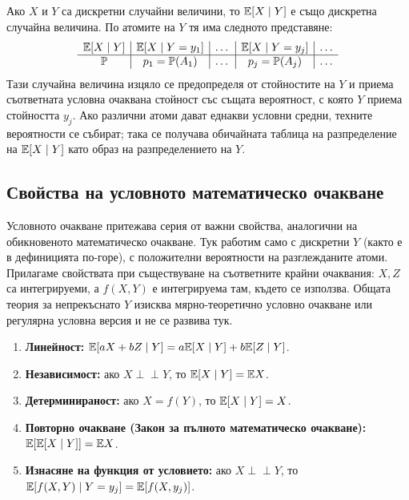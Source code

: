 \begin{prop}
Ако $X$ и $Y$ са дискретни случайни величини, то $\mathbb{E}[X\mid Y]$ е също дискретна случайна величина. По атомите на $Y$ тя има следното представяне:
\[
\begin{array}{c|c|c|c|c}
\mathbb{E}[X \mid Y] & \mathbb{E}[X \mid Y=y_1] & \dots & \mathbb{E}[X \mid Y=y_j] & \dots \\
\hline
\mathbb{P} & p_1 = \mathbb{P}(A_1) & \dots & p_j = \mathbb{P}(A_j) & \dots
\end{array}
\]
Тази случайна величина изцяло се предопределя от стойностите на $Y$ и приема съответната условна очаквана стойност със същата вероятност, с която $Y$ приема стойността $y_j$. Ако различни атоми дават еднакви условни средни, техните вероятности се събират; така се получава обичайната таблица на разпределение на $\mathbb{E}[X\mid Y]$ като образ на разпределението на $Y$.
\end{prop}

\subsection{Свойства на условното математическо очакване}

Условното очакване притежава серия от важни свойства, аналогични на обикновеното математическо очакване. Тук работим само с дискретни $Y$ (както е в дефиницията по-горе), с положителни вероятности на разглежданите атоми. Прилагаме свойствата при съществуване на съответните крайни очаквания: $X,Z$ са интегрируеми, а $f(X,Y)$ е интегрируема там, където се използва. Общата теория за непрекъснато $Y$ изисква мярно-теоретично условно очакване или регулярна условна версия и не се развива тук.

\begin{prop}\label{prop:cond-exp-props}
\begin{enumerate}
    \item[а)] \textbf{Линейност:}
    $\mathbb{E}[aX + bZ \mid Y] = a\mathbb{E}[X \mid Y] + b\mathbb{E}[Z \mid Y]$.
    \item[б)] \textbf{Независимост:} ако $X \perp\!\!\!\perp Y$, то $\mathbb{E}[X \mid Y] = \mathbb{E} X$.
    \item[в)] \textbf{Детерминираност:} ако $X = f(Y)$, то $\mathbb{E}[X \mid Y] = X$.
    \item[г)] \textbf{Повторно очакване (Закон за пълното математическо очакване):}
    $\mathbb{E}[\mathbb{E}[X \mid Y]] = \mathbb{E} X$.
    \item[д)] \textbf{Изнасяне на функция от условието:} ако $X \perp\!\!\!\perp Y$, то
    $\mathbb{E}[f(X,Y) \mid Y=y_j] = \mathbb{E}[f(X, y_j)]$.
\end{enumerate}
\end{prop}

